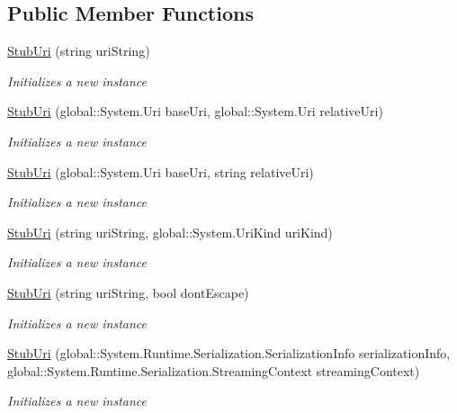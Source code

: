 \subsection*{Public Member Functions}
\begin{DoxyCompactItemize}
\item 
\hyperlink{class_system_1_1_fakes_1_1_stub_uri_a920389d6beddc4748ac61b66dbb3aee5}{Stub\-Uri} (string uri\-String)
\begin{DoxyCompactList}\small\item\em Initializes a new instance\end{DoxyCompactList}\item 
\hyperlink{class_system_1_1_fakes_1_1_stub_uri_a8440d3950dd6db78c31ded479adff398}{Stub\-Uri} (global\-::\-System.\-Uri base\-Uri, global\-::\-System.\-Uri relative\-Uri)
\begin{DoxyCompactList}\small\item\em Initializes a new instance\end{DoxyCompactList}\item 
\hyperlink{class_system_1_1_fakes_1_1_stub_uri_a26af5bb22b2e02a215dd5c2b26a16dfa}{Stub\-Uri} (global\-::\-System.\-Uri base\-Uri, string relative\-Uri)
\begin{DoxyCompactList}\small\item\em Initializes a new instance\end{DoxyCompactList}\item 
\hyperlink{class_system_1_1_fakes_1_1_stub_uri_ae200d523f6e1293c6a91c845a664e4c0}{Stub\-Uri} (string uri\-String, global\-::\-System.\-Uri\-Kind uri\-Kind)
\begin{DoxyCompactList}\small\item\em Initializes a new instance\end{DoxyCompactList}\item 
\hyperlink{class_system_1_1_fakes_1_1_stub_uri_a1f9a83db11f3d8b198fba0b30b79923e}{Stub\-Uri} (string uri\-String, bool dont\-Escape)
\begin{DoxyCompactList}\small\item\em Initializes a new instance\end{DoxyCompactList}\item 
\hyperlink{class_system_1_1_fakes_1_1_stub_uri_aa0ceaccbfbe1f4d7ef235fc3cdb53033}{Stub\-Uri} (global\-::\-System.\-Runtime.\-Serialization.\-Serialization\-Info serialization\-Info, global\-::\-System.\-Runtime.\-Serialization.\-Streaming\-Context streaming\-Context)
\begin{DoxyCompactList}\small\item\em Initializes a new instance\end{DoxyCompactList}\item 

\end{DoxyCompactItemize}
